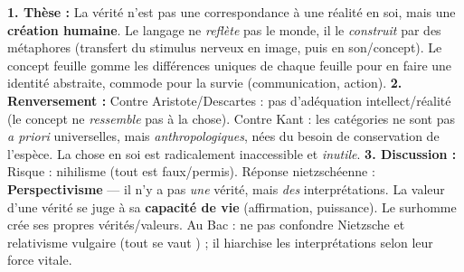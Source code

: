 \documentclass[11pt]{article}
\begin{document}
\begin{corrige}
\textbf{1. Thèse :} La vérité n'est pas une correspondance à une réalité en soi, mais une \textbf{création humaine}. Le langage ne \emph{reflète} pas le monde, il le \emph{construit} par des métaphores (transfert du stimulus nerveux en image, puis en son/concept). Le concept \guillemotleft feuille \guillemotright gomme les différences uniques de chaque feuille pour en faire une identité abstraite, commode pour la survie (communication, action).
\textbf{2. Renversement :} Contre Aristote/Descartes : pas d'adéquation intellect/réalité (le concept ne \emph{ressemble} pas à la chose). Contre Kant : les catégories ne sont pas \emph{a priori} universelles, mais \emph{anthropologiques}, nées du besoin de conservation de l'espèce. La \guillemotleft chose en soi \guillemotright est radicalement inaccessible et \emph{inutile}.
\textbf{3. Discussion :} Risque : nihilisme (tout est faux/permis). Réponse nietzschéenne : \textbf{Perspectivisme} — il n'y a pas \emph{une} vérité, mais \emph{des} interprétations. La valeur d'une vérité se juge à sa \textbf{capacité de vie} (affirmation, puissance). Le \guillemotleft surhomme \guillemotright crée ses propres vérités/valeurs. Au Bac : ne pas confondre Nietzsche et relativisme vulgaire (\guillemotleft tout se vaut \guillemotright) ; il hiarchise les interprétations selon leur force vitale.
\end{corrige}
\end{document}
